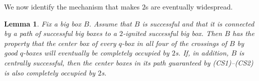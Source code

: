 \documentclass{article}
\numberwithin{equation}{section}
\newtheorem{lemma}[theorem]{Lemma}
\begin{document}
We now identify the mechanism that makes $2$s are eventually widespread.
\begin{lemma}\label{lem:spreadof2}  
    Fix a big box $B$. Assume that $B$ is successful and that it is connected by a path of successful big boxes to a $2$-ignited successful big box. Then $B$ has the property that the center box of every $q$-box in all four of the crossings of $B$ by good $q$-boxes  will eventually be completely occupied by $2$s. If, in addition, $B$ is centrally successful, then the center boxes in its path guaranteed by (CS1)--(CS2) is also completely occupied by $2$s.
\end{lemma}
\end{document}
